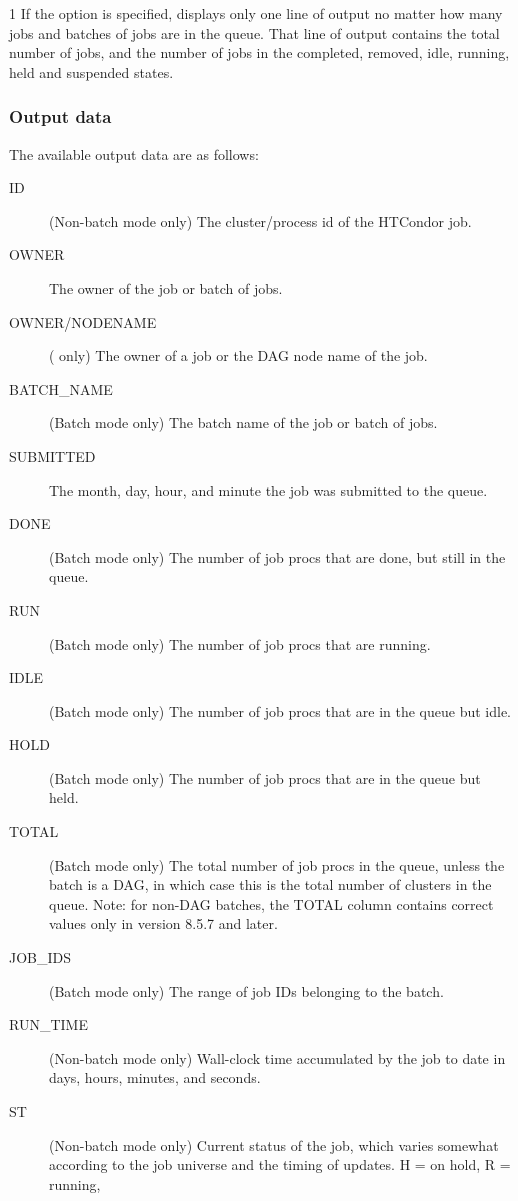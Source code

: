 \begin{ManPage}{\label{man-condor-q}}{1}
If the  option is specified,  displays
only one line of output no matter how many jobs and batches of
jobs are in the queue.  That line of output contains the total
number of jobs, and the number of jobs in the completed, removed,
idle, running, held and suspended states.

\subsubsection*{Output data}
The available output data are as follows:

\begin{description}
\item[ID] (Non-batch mode only) The cluster/process id of the HTCondor job. 
\item[OWNER] The owner of the job or batch of jobs. 
\item[OWNER/NODENAME] ( only) The owner of a job or the
	DAG node name of the job.
\item[BATCH\_NAME] (Batch mode only) The batch name of the job or batch
	of jobs.
\item[SUBMITTED] The month, day, hour, and minute the job was submitted
	to the queue. 
\item[DONE] (Batch mode only) The number of job procs that are done, but
	still in the queue.
\item[RUN] (Batch mode only) The number of job procs that are running.
\item[IDLE] (Batch mode only) The number of job procs that are in the
	queue but idle.
\item[HOLD] (Batch mode only) The number of job procs that are in the
	queue but held.
\item[TOTAL] (Batch mode only) The total number of job procs in the
	queue, unless the batch is a DAG, in which case this is the total
	number of clusters in the queue.  Note:  for non-DAG batches,
	the TOTAL column contains correct values only in version 8.5.7
	and later.
\item[JOB\_IDS] (Batch mode only) The range of job IDs belonging to the batch.
\item[RUN\_TIME]  (Non-batch mode only) Wall-clock time accumulated by
	the job to date in days, hours, minutes, and seconds.  
\item[ST] (Non-batch mode only) Current status of the job, which varies
	somewhat according
	to the job universe and the timing of updates.
        H = on hold,
        R = running,

\end{description}
\end{ManPage}
